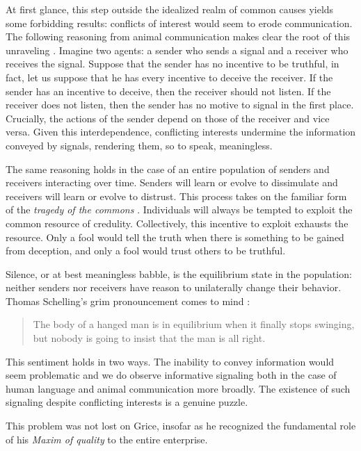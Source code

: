 \documentclass[linguex]{sp}
\theoremstyle{definition} \newtheorem{definition}{Definition}
\begin{document}
At first glance, this step outside the idealized realm of common causes yields some forbidding results: conflicts of interest would seem to erode communication. The following reasoning from animal communication makes clear the root of this unraveling \citep{searcy-nowicki:2005}. Imagine two agents: a sender who sends a signal and a receiver who receives the signal. Suppose that the sender has no incentive to be truthful, in fact, let us suppose that he has every incentive to deceive the receiver. If the sender has an incentive to deceive, then the receiver should not listen. If the receiver does not listen, then the sender has no motive to signal in the first place. Crucially, the actions of the sender depend on those of the receiver and vice versa. Given this interdependence, conflicting interests undermine the information conveyed by signals, rendering them, so to speak, meaningless. 

The same reasoning holds in the case of an entire population of senders and receivers interacting over time. Senders will learn or evolve to dissimulate and receivers will learn or evolve to distrust. This process takes on the familiar form of the \emph{tragedy of the commons} \citep{hardin:1968}. Individuals will always be tempted to exploit the common resource of credulity. Collectively, this incentive to exploit exhausts the resource. Only a fool would tell the truth when there is something to be gained from deception, and only a fool would trust others to be truthful. 

Silence, or at best meaningless babble, is the equilibrium state in the population: neither senders nor receivers have reason to unilaterally change their behavior. Thomas Schelling's grim pronouncement comes to mind \citeyearpar[26]{schelling:1978}:  

\begin{quote}
The body of a hanged man is in equilibrium when it finally stops swinging, but nobody is going to insist that the man is all right.
\end{quote}
This sentiment holds in two ways. The inability to convey information would seem problematic and we do observe informative signaling both in the case of human language and animal communication more broadly. The existence of such signaling despite conflicting interests is a genuine puzzle.

This problem was not lost on Grice, insofar as he recognized the fundamental role of his \emph{Maxim of quality} to the entire enterprise.
\end{document}

